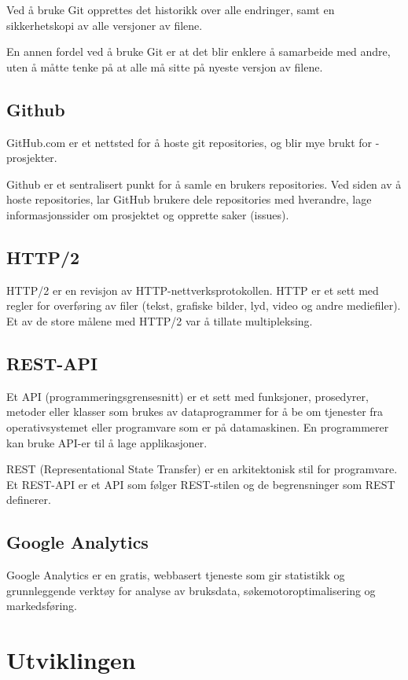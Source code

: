 Ved å bruke Git opprettes det historikk over alle endringer, samt en sikkerhetskopi av alle versjoner av filene.

En annen fordel ved å bruke Git er at det blir enklere å samarbeide med andre, uten å måtte tenke på at alle må sitte på nyeste versjon av filene.

\subsection{Github}
GitHub.com er et nettsted for å hoste git repositories, og blir mye brukt for -prosjekter. 

Github\cite{TechTarget} er et sentralisert punkt for å samle en brukers repositories. Ved siden av å hoste repositories, lar GitHub brukere dele repositories med hverandre, lage informasjonssider om prosjektet og opprette saker (issues).

\subsection{HTTP/2}
HTTP/2\cite{Belshe2015httpv} er en revisjon av HTTP-nettverksprotokollen. HTTP er et sett med regler for overføring av filer (tekst, grafiske bilder, lyd, video og andre mediefiler). Et av de store målene med HTTP/2 var å tillate multipleksing.

\subsection{REST-API}
Et API (programmeringsgrensesnitt) er et sett med funksjoner, prosedyrer, metoder eller klasser som brukes av dataprogrammer for å be om tjenester fra operativsystemet eller programvare som er på datamaskinen. En programmerer kan bruke API-er til å lage applikasjoner.

REST (Representational State Transfer) er en arkitektonisk stil for programvare. Et REST-API\cite{Masse2011radr} er et API som følger REST-stilen og de begrensninger som REST definerer.

\subsection{Google Analytics}
\label{sec:google-analytics}
Google Analytics \cite{google2019gtk} er en gratis, webbasert tjeneste som gir statistikk og grunnleggende verktøy for analyse av bruksdata, søkemotoroptimalisering og markedsføring.

\section{Utviklingen}

